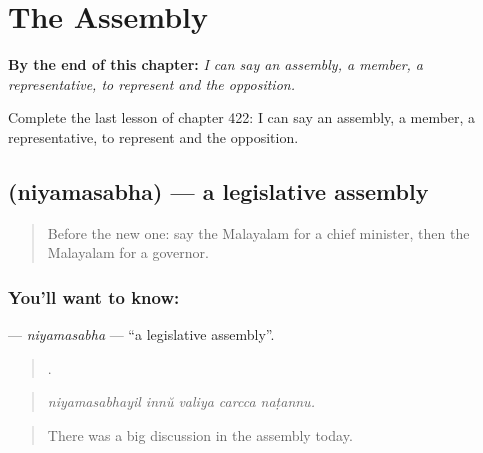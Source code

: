 
\chapter{The Assembly}
\label{ch:ml-the-assembly}

\begin{chapteropening}
\textbf{By the end of this chapter:} \emph{I can say an assembly, a member, a representative, to represent and the opposition.}

Complete the last lesson of chapter 422: I can say an assembly, a member, a representative, to represent and the opposition.
\end{chapteropening}

\section[\texorpdfstring{\ml{നിയമസഭ} (niyamasabha)}{നിയമസഭ (niyamasabha)}]{ (niyamasabha) — a legislative assembly}

\label{lesson:ML-C422-niyamasabha}



\begin{quote}
Before the new one: say the Malayalam for a chief minister, then the Malayalam for a governor.
\end{quote}

\subsection*{You'll want to know: }
\textbf{} — \emph{niyamasabha} — \textquotedblleft{}a legislative assembly\textquotedblright{}.

\begin{quote}
    .
\end{quote}

\begin{quote}
\emph{niyamasabhayil innŭ valiya carcca naṭannu.}
\end{quote}

\begin{quote}
There was a big discussion in the assembly today.
\end{quote}

